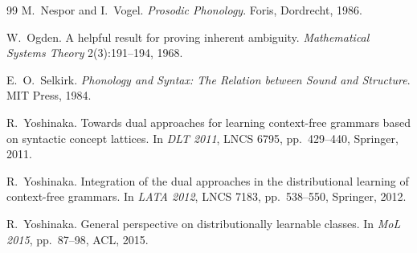 \documentclass[11pt,a4paper]{ltjsarticle}
\numberwithin{equation}{section}
\theoremstyle{plain}
\theoremstyle{definition}
\theoremstyle{remark}
\theoremstyle{plain}
\begin{document}
\begin{thebibliography}{99}
M.~Nespor and I.~Vogel.
\textit{Prosodic Phonology}.
Foris, Dordrecht, 1986.

W.~Ogden.
A helpful result for proving inherent ambiguity.
\textit{Mathematical Systems Theory} 2(3):191--194, 1968.

E.~O.~Selkirk.
\textit{Phonology and Syntax: The Relation between Sound and Structure}.
MIT Press, 1984.

R.~Yoshinaka.
Towards dual approaches for learning context-free grammars based on
syntactic concept lattices.
In \textit{DLT 2011}, LNCS 6795, pp.~429--440, Springer, 2011.

R.~Yoshinaka.
Integration of the dual approaches in the distributional learning of
context-free grammars.
In \textit{LATA 2012}, LNCS 7183, pp.~538--550, Springer, 2012.

R.~Yoshinaka.
General perspective on distributionally learnable classes.
In \textit{MoL 2015}, pp.~87--98, ACL, 2015.

\end{thebibliography}
\end{document}
